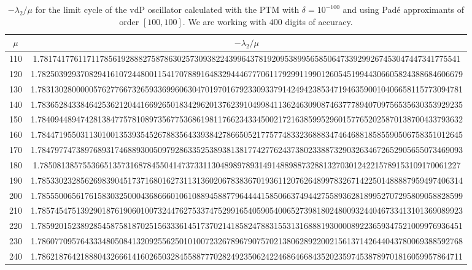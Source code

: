 \documentclass[final]{article}
\begin{document}
\begin{table}
\caption{$-\lambda_2/\mu$ for the limit cycle of the vdP oscillator calculated with the PTM with $\delta=10^{-100}$ and using Pad\'e approximants of order $[100,100]$. We are working with $400$ digits of accuracy. }
\bigskip
\label{table_Lyap_vdP2}
\begin{center}
\begin{tabular}{|c|c|}
\hline
$\mu$ &   $-\lambda_2/\mu$    \\
\hline
110 &   1.78174177611711785619288827587863025730938224399643781920953899565850647339299267453047447341775541    \\
120 &   1.782503929370829416107244800115417078891648329444677706117929911990126054519944306605824388684606679   \\
130 &   1.783130280000057627766732659336996063047019701679233093379142494238534719463590010406658115773094781   \\
140 &   1.783652843384642536212044166926501834296201376239104998411362463090874637778940709756535630353929235   \\
150 &   1.784094489474281384775781089735677536861981176623433450021721638599529601577652025870138700433793632   \\
160 &   1.784471955031130100135393545267883564339384278665052177577483323688834746468818585590506758351012645   \\
170 &   1.784797747389768931746889300509792863352538938138177427762437380233887329032634672652905655073469093   \\
180 &   1.78508138575536651357316878455041473733113048989789314914889887328813270301242215789153109170061227    \\
190 &   1.785330232856269839045173716801627311313602067838367019361120762648997832671422501488887959497406314   \\
200 &   1.785550065617615830325000436866601061088945887796444415850663749442755893628189952707295809058828599   \\
210 &   1.785745475139290187619060100732447627533747529916540590540065273981802480093244046733413101369089923   \\
220 &   1.785920152389285458758187025156333614517370214185824788315531316888193000089223659347521009976936451   \\
230 &   1.786077095764333480508413209255625010100723267896790757021380628922002156137142644043780069388592768   \\
240 &   1.786218764218880432666141602650328455887770282492350624224686466843520235974538789701816059957864711   \\

\end{tabular}
\end{center}
\end{table}
\end{document}
